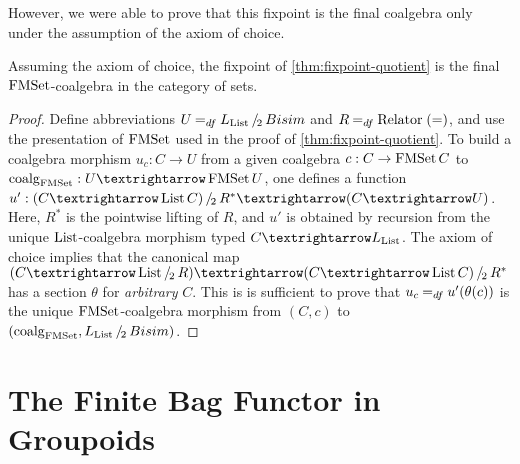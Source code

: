 \documentclass[final,a4paper,USenglish,cleveref]{lipics-v2021}
\begin{document}
However, we were able to prove that this fixpoint is the final coalgebra only under the assumption of the axiom of choice. 
\begin{theorem}\label{thm:final-quotient}
  Assuming the axiom of choice, the fixpoint of \cref{thm:fixpoint-quotient} is the final $\FMSet$-coalgebra in the category of sets.
\end{theorem}
\begin{proof}
  Define abbreviations $U \DefEq \SetQuot[\Lim{\List}][\Bisim]$ and $R \DefEq \Relator\; (=)$, and use the presentation of $\FMSet$ used in the proof of \cref{thm:fixpoint-quotient}.
  To build a coalgebra morphism $u_c : C → U$ from a given coalgebra $c : C \to \FMSet C$ to $\coalg{\FMSet} : U → \FMSet U$,
  one defines a function $u' : \SetQuot[(C → \List C)][R^*] → (C → U)$.
  Here, $R^*$ is the pointwise lifting of $R$,
  and $u'$ is obtained by recursion from the unique $\List$-coalgebra morphism typed $C → \Lim{\List}$.
  The axiom of choice implies that the canonical map $(C → \SetQuot[\List][R]) → \SetQuot[(C → \List C)][R^*]$
  has a section $\theta$ for \emph{arbitrary} $C$.
  This is is sufficient to prove that $u_c \DefEq u'(\theta(c))$ is the unique $\FMSet$-coalgebra morphism from $(C,c)$ to $(\coalg{\FMSet},\SetQuot[\Lim{\List}][\Bisim])$.
\end{proof}


\section{The Finite Bag Functor in Groupoids}\label{sec:finite-bags-groupoids}
\end{document}
